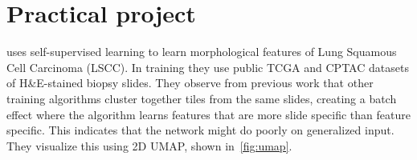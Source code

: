 \documentclass[10pt,twocolumn,letterpaper]{article}
\begin{document}
% 
% 
% 
% 
% 
% 

\section{Practical project}
\cite{sslUMAP} uses self-supervised learning to learn morphological features of Lung Squamous Cell Carcinoma (LSCC). In training they use public TCGA and CPTAC datasets of H\&E-stained biopsy slides. They observe from previous work that other training algorithms cluster together tiles from the same slides, creating a batch effect where the algorithm learns features that are more slide specific than feature specific. This indicates that the network might do poorly on generalized input. They visualize this using 2D UMAP, shown in~\cref{fig:umap}.
\end{document}
